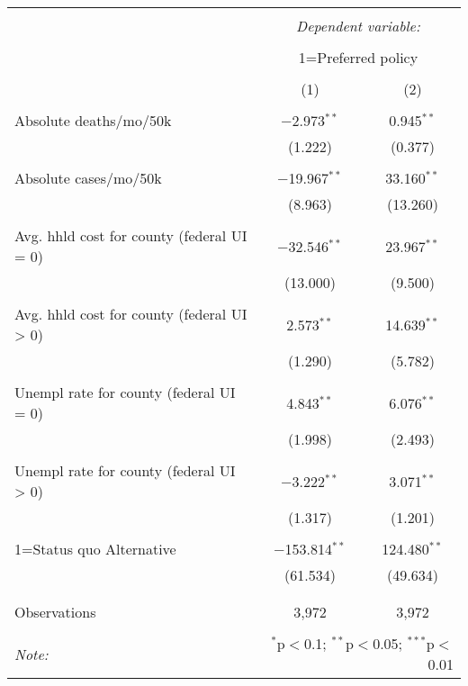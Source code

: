 
\begin{table}[!htbp] \centering 
  \caption{} 
  \label{} 
\begin{tabular}{@{\extracolsep{5pt}}lcc} 
\\[-1.8ex]\hline 
\hline \\[-1.8ex] 
 & \multicolumn{2}{c}{\textit{Dependent variable:}} \\ 
\cline{2-3} 
\\[-1.8ex] & \multicolumn{2}{c}{1=Preferred policy} \\ 
\\[-1.8ex] & (1) & (2)\\ 
\hline \\[-1.8ex] 
 Absolute deaths/mo/50k & $-$2.973$^{**}$ & 0.945$^{**}$ \\ 
  & (1.222) & (0.377) \\ 
  & & \\ 
 Absolute cases/mo/50k & $-$19.967$^{**}$ & 33.160$^{**}$ \\ 
  & (8.963) & (13.260) \\ 
  & & \\ 
 Avg. hhld cost for county (federal UI = 0) & $-$32.546$^{**}$ & 23.967$^{**}$ \\ 
  & (13.000) & (9.500) \\ 
  & & \\ 
 Avg. hhld cost for county (federal UI > 0) & 2.573$^{**}$ & 14.639$^{**}$ \\ 
  & (1.290) & (5.782) \\ 
  & & \\ 
 Unempl rate for county (federal UI = 0) & 4.843$^{**}$ & 6.076$^{**}$ \\ 
  & (1.998) & (2.493) \\ 
  & & \\ 
 Unempl rate for county (federal UI > 0) & $-$3.222$^{**}$ & 3.071$^{**}$ \\ 
  & (1.317) & (1.201) \\ 
  & & \\ 
 1=Status quo Alternative & $-$153.814$^{**}$ & 124.480$^{**}$ \\ 
  & (61.534) & (49.634) \\ 
  & & \\ 
\hline \\[-1.8ex] 
Observations & 3,972 & 3,972 \\ 
\hline 
\hline \\[-1.8ex] 
\textit{Note:}  & \multicolumn{2}{r}{$^{*}$p$<$0.1; $^{**}$p$<$0.05; $^{***}$p$<$0.01} \\ 
\end{tabular} 
\end{table} 
